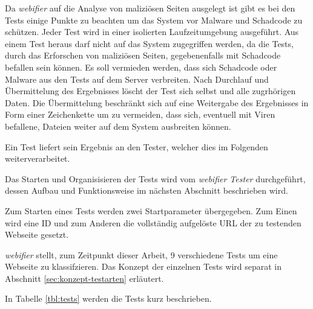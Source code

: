 Da \textit{webifier} auf die Analyse von maliziösen Seiten ausgelegt ist gibt es bei den Tests
einige Punkte zu beachten um das System vor Malware und Schadcode zu schützen.
Jeder Test wird in einer isolierten Laufzeitumgebung ausgeführt. Aus einem Test
heraus darf nicht auf das System zugegriffen werden, da die Tests, durch das Erforschen von
maliziösen Seiten, gegebenenfalls mit Schadcode befallen sein können. Es soll vermieden werden,
dass sich Schadcode oder Malware aus den Tests auf dem Server verbreiten. Nach Durchlauf und
Übermittelung des Ergebnisses löscht der Test sich selbst und alle zugrhörigen Daten. Die
Übermittelung beschränkt sich auf eine Weitergabe des Ergebnisses in Form einer Zeichenkette um zu
vermeiden, dass sich, eventuell mit Viren befallene, Dateien weiter auf dem System ausbreiten
können.

Ein Test liefert sein Ergebnis an den Tester, welcher dies im Folgenden weiterverarbeitet.

Das Starten und Organisisieren der Tests wird vom \textit{webifier Tester} durchgeführt, dessen
Aufbau und Funktionsweise im nächsten Abschnitt beschrieben wird. 

Zum Starten eines Tests werden zwei Startparameter übergegeben. Zum Einen wird eine ID und zum
Anderen die vollständig aufgelöste URL der zu testenden Webseite gesetzt.
 
\textit{webifier} stellt, zum Zeitpunkt dieser Arbeit, 9 verschiedene Tests um eine Webseite zu
klassifzieren.
Das Konzept der einzelnen Tests wird separat in Abschnitt
\ref{sec:konzept-testarten} erläutert.

In Tabelle \ref{tbl:tests} werden die Tests kurz beschrieben.

